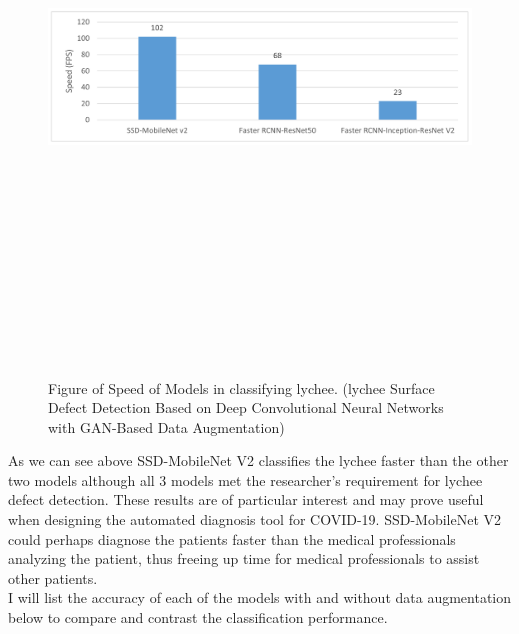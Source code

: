  \begin{figure}[H]
    \centering
    \includegraphics[width=1\textwidth,height=15cm,keepaspectratio]{Images/AnalysisofModelSpeedlychee.png}\\
    \caption{Figure of Speed of Models in classifying lychee. (lychee Surface Defect Detection Based on Deep Convolutional Neural Networks with GAN-Based Data Augmentation)\cite{litReviewLychee}}
    \label{fig:Figure of Speed of Models in classifying lychee (lychee Surface Defect Detection Based on Deep Convolutional Neural Networks with GAN-Based Data Augmentation) }
\end{figure}
As we can see above SSD-MobileNet V2 classifies the lychee faster than the other two models although all 3 models met the researcher's requirement for lychee defect detection.  These results are of particular interest and may prove useful when designing the automated diagnosis tool for COVID-19.  SSD-MobileNet V2 could perhaps diagnose the patients faster than the medical professionals analyzing the patient, thus freeing up time for medical professionals to assist other patients.
\\
I will list the accuracy of each of the models with and without data augmentation below to compare and contrast the classification performance.
